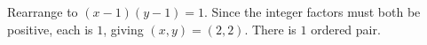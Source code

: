 Rearrange to $(x-1)(y-1)=1$. Since the integer factors must both be positive, each is $1$, giving $(x,y)=(2,2)$. There is $\boxed1$ ordered pair.
